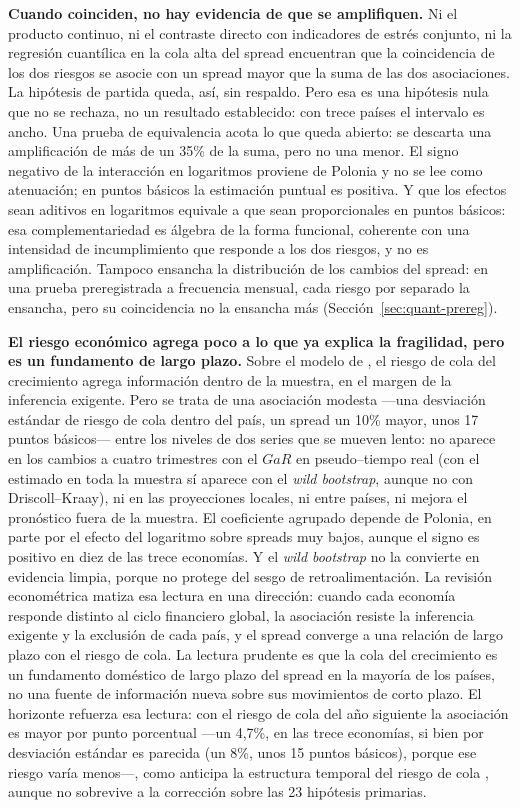 \textbf{Cuando coinciden, no hay evidencia de que se amplifiquen.} Ni el producto continuo, ni el contraste directo con indicadores de estrés conjunto, ni la regresión cuantílica en la cola alta del spread encuentran que la coincidencia de los dos riesgos se asocie con un spread mayor que la suma de las dos asociaciones. La hipótesis de partida queda, así, sin respaldo. Pero esa es una hipótesis nula que no se rechaza, no un resultado establecido: con trece países el intervalo es ancho. Una prueba de equivalencia acota lo que queda abierto: se descarta una amplificación de más de un 35\% de la suma, pero no una menor. El signo negativo de la interacción en logaritmos proviene de Polonia y no se lee como atenuación; en puntos básicos la estimación puntual es positiva. Y que los efectos sean aditivos en logaritmos equivale a que sean proporcionales en puntos básicos: esa complementariedad es álgebra de la forma funcional, coherente con una intensidad de incumplimiento que responde a los dos riesgos, y no es amplificación. Tampoco ensancha la distribución de los cambios del spread: en una prueba preregistrada a frecuencia mensual, cada riesgo por separado la ensancha, pero su coincidencia no la ensancha más (Sección~\ref{sec:quant-prereg}).

\textbf{El riesgo económico agrega poco a lo que ya explica la fragilidad, pero es un fundamento de largo plazo.} Sobre el modelo de \citet{Chari2024b}, el riesgo de cola del crecimiento agrega información dentro de la muestra, en el margen de la inferencia exigente. Pero se trata de una asociación modesta ---una desviación estándar de riesgo de cola dentro del país, un spread un 10\% mayor, unos 17 puntos básicos--- entre los niveles de dos series que se mueven lento: no aparece en los cambios a cuatro trimestres con el $GaR$ en pseudo--tiempo real (con el estimado en toda la muestra sí aparece con el \textit{wild bootstrap}, aunque no con Driscoll--Kraay), ni en las proyecciones locales, ni entre países, ni mejora el pronóstico fuera de la muestra. El coeficiente agrupado depende de Polonia, en parte por el efecto del logaritmo sobre spreads muy bajos, aunque el signo es positivo en diez de las trece economías. Y el \textit{wild bootstrap} no la convierte en evidencia limpia, porque no protege del sesgo de retroalimentación. La revisión econométrica matiza esa lectura en una dirección: cuando cada economía responde distinto al ciclo financiero global, la asociación resiste la inferencia exigente y la exclusión de cada país, y el spread converge a una relación de largo plazo con el riesgo de cola. La lectura prudente es que la cola del crecimiento es un fundamento doméstico de largo plazo del spread en la mayoría de los países, no una fuente de información nueva sobre sus movimientos de corto plazo. El horizonte refuerza esa lectura: con el riesgo de cola del año siguiente la asociación es mayor por punto porcentual ---un 4,7\%, en las trece economías, si bien por desviación estándar es parecida (un 8\%, unos 15 puntos básicos), porque ese riesgo varía menos---, como anticipa la estructura temporal del riesgo de cola \citep{AdrianEtAl2022}, aunque no sobrevive a la corrección sobre las 23 hipótesis primarias.

